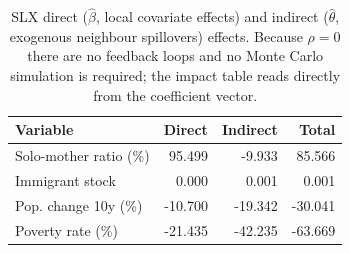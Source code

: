 \begin{table}[ht]
\centering
\caption{SLX direct ($\hat{\beta}$, local covariate effects) and indirect ($\hat{\theta}$, exogenous neighbour spillovers) effects. Because $\rho = 0$ there are no feedback loops and no Monte Carlo simulation is required; the impact table reads directly from the coefficient vector.} 
\label{tab:slx_impacts}
\begin{tabular}{lrrr}
  \toprule
Variable & Direct & Indirect & Total \\ 
  \midrule
Solo-mother ratio (\%) & 95.499 & -9.933 & 85.566 \\ 
  Immigrant stock & 0.000 & 0.001 & 0.001 \\ 
  Pop. change 10y (\%) & -10.700 & -19.342 & -30.041 \\ 
  Poverty rate (\%) & -21.435 & -42.235 & -63.669 \\ 
   \bottomrule
\end{tabular}
\end{table}
